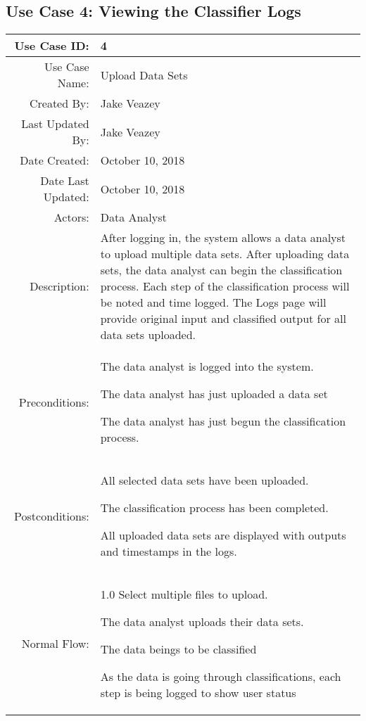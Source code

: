 \documentclass[12pt,oneside,letterpaper]{article}
\newenvironment{packed_enumerate}{ %
\vspace{-7mm}
\begin{enumerate}
  \setlength{\itemsep}{0pt}
  \setlength{\parskip}{0pt}
  \setlength{\parsep}{0pt}
}{\end{enumerate}
\vspace{-8mm}}
\begin{document}
\subsection{\label{Upload Data Sets}Use Case 4: Viewing the Classifier Logs}

\begin{longtable}{|r|p{3.8in}|}
\hline
Use Case ID:&4\\
\hline
Use Case Name:&Upload Data Sets\\
\hline
Created By:&Jake Veazey\\
\hline
Last Updated By:&Jake Veazey\\
\hline
Date Created:&October 10, 2018\\
\hline
Date Last Updated:&October 10, 2018\\
\hline
Actors:&Data Analyst\\
\hline
Description:&After logging in, the system allows a data analyst to upload multiple data sets. After uploading data sets, the data analyst can begin the classification process. Each step of the classification process will be noted and time logged. The Logs page will provide original input and classified output for all data sets uploaded.\\
\hline
Preconditions:&\begin{packed_enumerate}
\item The data analyst is logged into the system.
\item The data analyst has just uploaded a data set
\item The data analyst has just begun the classification process.
\end{packed_enumerate}\\
\hline
Postconditions:&\begin{packed_enumerate}
\item All selected data sets have been uploaded.
\item The classification process has been completed.
\item All uploaded data sets are displayed with outputs and timestamps in the logs.
\end{packed_enumerate}\\
\hline
Normal Flow:&1.0 Select multiple files to upload.\newline
\begin{packed_enumerate}
\item The data analyst uploads their data sets.
\item The data beings to be classified
\item As the data is going through classifications, each step is being logged to show user status

\end{packed_enumerate}
\end{longtable}
\end{document}
